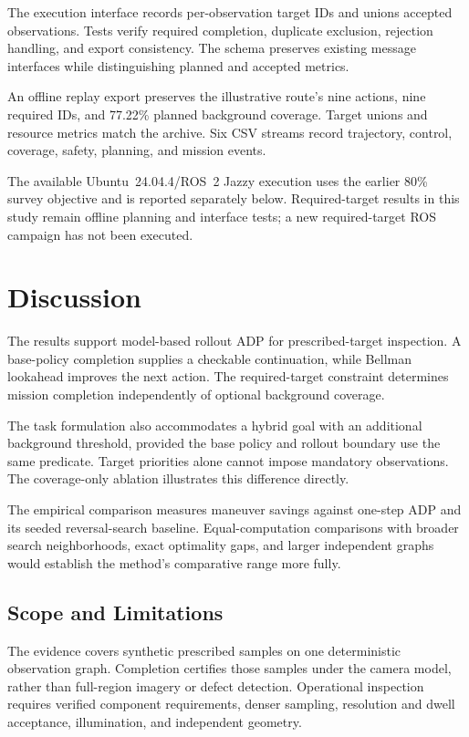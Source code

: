 The execution interface records per-observation target IDs and unions accepted observations. Tests verify required completion, duplicate exclusion, rejection handling, and export consistency. The schema preserves existing message interfaces while distinguishing planned and accepted metrics.

An offline replay export preserves the illustrative route's nine actions, nine required IDs, and 77.22\% planned background coverage. Target unions and resource metrics match the archive. Six CSV streams record trajectory, control, coverage, safety, planning, and mission events.

The available Ubuntu~24.04.4/ROS~2 Jazzy execution uses the earlier 80\% survey objective and is reported separately below. Required-target results in this study remain offline planning and interface tests; a new required-target ROS campaign has not been executed.

\ifincludeROSVerificationResults
  
\fi

\section{Discussion}
\label{sec:discussion}

The results support model-based rollout ADP for prescribed-target inspection. A base-policy completion supplies a checkable continuation, while Bellman lookahead improves the next action. The required-target constraint determines mission completion independently of optional background coverage.

The task formulation also accommodates a hybrid goal with an additional background threshold, provided the base policy and rollout boundary use the same predicate. Target priorities alone cannot impose mandatory observations. The coverage-only ablation illustrates this difference directly.

The empirical comparison measures maneuver savings against one-step ADP and its seeded reversal-search baseline. Equal-computation comparisons with broader search neighborhoods, exact optimality gaps, and larger independent graphs would establish the method's comparative range more fully.

\subsection{Scope and Limitations}

The evidence covers synthetic prescribed samples on one deterministic observation graph. Completion certifies those samples under the camera model, rather than full-region imagery or defect detection. Operational inspection requires verified component requirements, denser sampling, resolution and dwell acceptance, illumination, and independent geometry.

